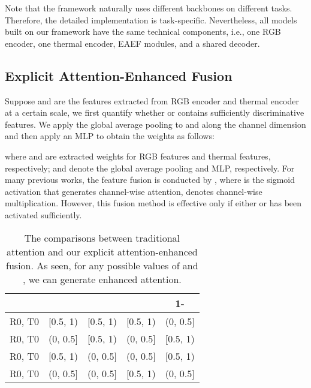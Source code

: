 \documentclass[letterpaper, 10 pt, journal, twoside]{IEEEtran}
\begin{document}
 Note that the framework naturally uses different backbones on different tasks.
 Therefore, the detailed implementation is task-specific. Nevertheless, all models built on our framework have the same technical components, i.e., one RGB encoder, one thermal encoder, EAEF modules, and a shared decoder.






\subsection{Explicit Attention-Enhanced Fusion}













Suppose  and  are the features extracted from RGB encoder and thermal encoder at a certain scale, we first 
quantify whether  or  contains sufficiently discriminative features.
We apply the global average pooling to  and  along the channel dimension and then apply an MLP to obtain the weights as follows:


where  and  are extracted weights for RGB features and thermal features, respectively;
 and  denote the global average pooling and MLP, respectively. 
For many previous works, the feature fusion is conducted by , where  is the sigmoid activation that generates channel-wise attention,  denotes channel-wise multiplication. However, this fusion method is effective only if either  or  has been activated sufficiently. 


 \begin{table}[t]
\caption{The comparisons between traditional attention and our explicit attention-enhanced fusion. As seen, for any possible values of  and , we can generate enhanced attention.}
\renewcommand\arraystretch{1.2}
\begin{center}
\label{datasets}
\begin{tabular}
{c|cccc}
\hline
 &  &  & & 1-  \\ 
 \hline
 R0, T0 &[0.5, 1) &[0.5, 1) &[0.5, 1) &(0, 0.5]\\
R0, T0 &(0, 0.5] &[0.5, 1) &(0, 0.5] &[0.5, 1)\\
 R0, T0 &[0.5, 1) &(0, 0.5] &(0, 0.5] &[0.5, 1) \\
R0, T0 &(0, 0.5] &(0, 0.5] &[0.5, 1) &(0, 0.5]\\
\hline
\end{tabular}
\end{center}
\label{attention_cases}
\end{table}
\end{document}
